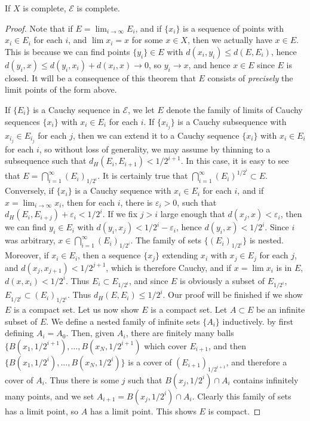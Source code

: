 \begin{theorem}
	If $X$ is complete, $\mathcal{E}$ is complete.
\end{theorem}
\begin{proof}
	Note that if $E = \lim_{i \to \infty} E_i$, and if $\{ x_i \}$ is a sequence of points with $x_i \in E_i$ for each $i$, and $\lim x_i = x$ for some $x \in X$, then we actually have $x \in E$. This is because we can find points $\{ y_i \} \in E$ with $d(x_i,y_i) \leq d(E,E_i)$, hence $d(y_i,x) \leq d(y_i,x_i) + d(x_i,x) \to 0$, so $y_i \to x$, and hence $x \in E$ since $E$ is closed. It will be a consequence of this theorem that $E$ consists of \emph{precisely} the limit points of the form above.

	If $\{ E_i \}$ is a Cauchy sequence in $\mathcal{E}$, we let $E$ denote the family of limits of Cauchy sequences $\{ x_i \}$ with $x_i \in E_i$ for each $i$. If $\{ x_{i_j} \}$ is a Cauchy subsequence with $x_{i_j} \in E_{i_j}$ for each $j$, then we can extend it to a Cauchy sequence $\{ x_i \}$ with $x_i \in E_i$ for each $i$, so without loss of generality, we may assume by thinning to a subsequence such that $d_H(E_i,E_{i+1}) < 1/2^{i+1}$. In this case, it is easy to see that $E = \bigcap_{i = 1}^\infty (E_i)_{1/2^i}$. It is certainly true that $\bigcap_{i = 1}^\infty (E_i)^{1/2^i} \subset E$. Conversely, if $\{ x_i \}$ is a Cauchy sequence with $x_i \in E_i$ for each $i$, and if $x = \lim_{i \to \infty} x_i$, then for each $i$, there is $\varepsilon_i > 0$, such that $d_H(E_i,E_{i+j}) + \varepsilon_i < 1/2^i$. If we fix $j > i$ large enough that $d(x_j,x) < \varepsilon_i$, then we can find $y_i \in E_i$ with $d(y_i,x_j) < 1/2^i - \varepsilon_i$, hence $d(y_i,x) < 1/2^i$. Since $i$ was arbitrary, $x \in \bigcap_{i = 1}^\infty (E_i)_{1/2^i}$. The family of sets $\{ (E_i)_{1/2^i} \}$ is nested. Moreover, if $x_i \in E_i$, then a sequence $\{ x_j \}$ extending $x_i$ with $x_j \in E_j$ for each $j$, and $d(x_j,x_{j+1}) < 1/2^{j+1}$, which is therefore Cauchy, and if $x = \lim x_i$ is in $E$, $d(x,x_i) < 1/2^i$. Thus $E_i \subset E_{1/2^i}$, and since $E$ is obviously a subset of $E_{1/2^i}$, $E_{1/2^i} \subset (E_i)_{1/2^i}$. Thus $d_H(E,E_i) \leq 1/2^i$. Our proof will be finished if we show $E$ is a compact set. Let us now show $E$ is a compact set. Let $A \subset E$ be an infinite subset of $E$. We define a nested family of infinite sets $\{ A_i \}$ inductively. by first defining $A_i = A_0$. Then, given $A_i$, there are finitely many balls $\{ B(x_1,1/2^{i+1}), \dots, B(x_N,1/2^{i+1})$ which cover $E_{i+1}$, and then $\{ B(x_1,1/2^i), \dots, B(x_N,1/2^i) \}$ is a cover of $(E_{i+1})_{1/2^{i+1}}$, and therefore a cover of $A_i$. Thus there is some $j$ such that $B(x_j,1/2^i) \cap A_i$ contains infinitely many points, and we set $A_{i+1} = B(x_j,1/2^i) \cap A_i$. Clearly this family of sets has a limit point, so $A$ has a limit point. This shows $E$ is compact.
\end{proof}

